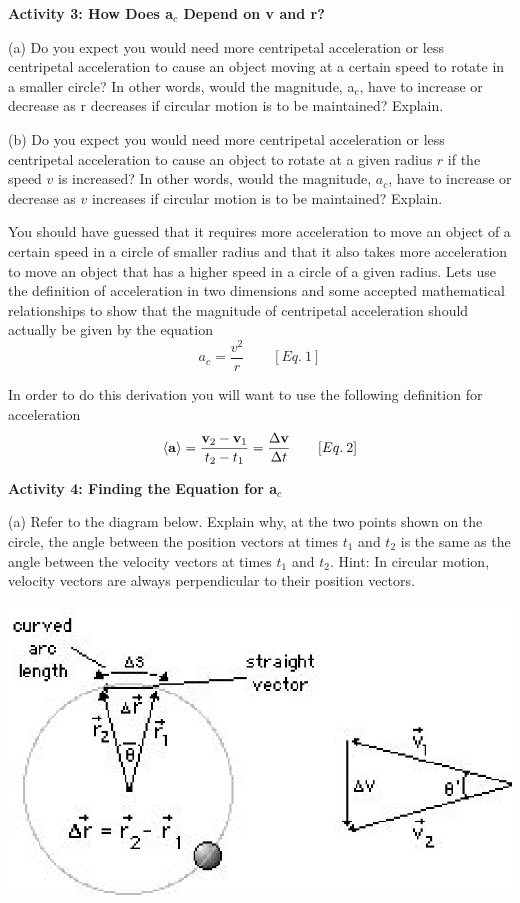 \textbf{Activity 3: How Does a\( _{c} \) Depend on v and r?} 

(a) Do you expect you would need more centripetal acceleration or less centripetal
acceleration to cause an object moving at a certain speed to rotate in a smaller
circle? In other words, would the magnitude, a\( _{c} \), have to increase
or decrease as r decreases if circular motion is to be maintained? Explain.
\vspace{20mm}

(b) Do you expect you would need more centripetal acceleration or less centripetal
acceleration to cause an object to rotate at a given radius $r$ if the speed $v$
is increased? In other words, would the magnitude, \( a_{c} \), have to increase
or decrease as $v$ increases if circular motion is to be maintained? Explain.
\vspace{20mm}

You should have guessed that it requires more acceleration to move an object
of a certain speed in a circle of smaller radius and that it also takes more
acceleration to move an object that has a higher speed in a circle of a given
radius. Lets use the definition of acceleration in two dimensions and some accepted
mathematical relationships to show that the magnitude of centripetal acceleration
should actually be given by the equation
\[
a_{c}=\frac{v^{2}}{r}\qquad [Eq.\: 1]\]


In order to do this derivation you will want to use the following definition
for acceleration
\[
\left\langle {\bf a}\right\rangle =\frac{{{\bf v}_{2}}-{{\bf v}_{1}}}{t_{2}-t_{1}}=\frac{\Delta {\bf v}}{\Delta t}\qquad [Eq.\: 2]\]


\textbf{Activity 4: Finding the Equation for a\( _{c} \) }

(a) Refer to the diagram below. Explain why, at the two points shown on the
circle, the angle between the position vectors at times \( t_{1} \) and \( t_{2} \)
is the same as the angle between the velocity vectors at times \( t_{1} \)
and \( t_{2} \). Hint: In circular motion, velocity vectors are always perpendicular
to their position vectors.

\vspace{0.3cm}
{\par\raggedright \includegraphics{circ_motion_fig3.eps} \par}
\vspace{0.3cm}

